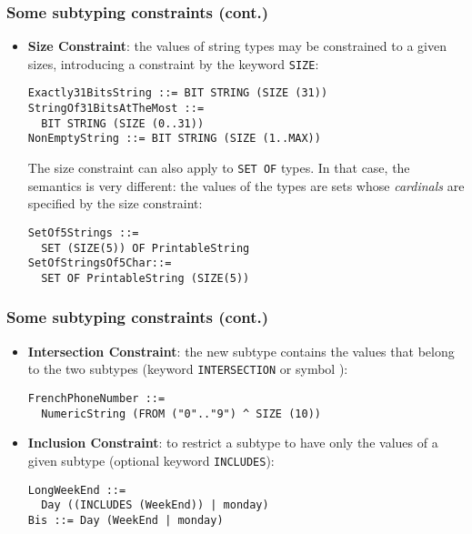 \documentclass[compress,dvips,xcolor={dvipsnames},t]{beamer}
\begin{document}
\begin{frame}[containsverbatim]
\frametitle{Some subtyping constraints (cont.)}

\begin{itemize}

  \item \textbf{Size Constraint}: the values of string types may be
        constrained to a given sizes, introducing a constraint by the
        keyword \texttt{SIZE}:

\begin{verbatim}
Exactly31BitsString ::= BIT STRING (SIZE (31))
StringOf31BitsAtTheMost ::=
  BIT STRING (SIZE (0..31))
NonEmptyString ::= BIT STRING (SIZE (1..MAX))
\end{verbatim}

The size constraint can also apply to \texttt{SET OF} types. In that
case, the semantics is very different: the values of the types are
sets whose \emph{cardinals} are specified by the size constraint:

\begin{verbatim}
SetOf5Strings ::=
  SET (SIZE(5)) OF PrintableString
SetOfStringsOf5Char::=
  SET OF PrintableString (SIZE(5))
\end{verbatim}

\end{itemize}

\end{frame}

\begin{frame}[containsverbatim]
\frametitle{Some subtyping constraints (cont.)}

\begin{itemize}

  \item \textbf{Intersection Constraint}: the new subtype contains the
        values that belong to the two subtypes (keyword
        \texttt{INTERSECTION} or symbol \texttt{}):

\begin{verbatim}
FrenchPhoneNumber ::= 
  NumericString (FROM ("0".."9") ^ SIZE (10))
\end{verbatim}

  \item \textbf{Inclusion Constraint}: to restrict a subtype to have
        only the values of a given subtype (optional keyword
        \texttt{INCLUDES}):

\begin{verbatim}
LongWeekEnd ::=
  Day ((INCLUDES (WeekEnd)) | monday)
Bis ::= Day (WeekEnd | monday)
\end{verbatim}
\end{itemize}

\end{frame}
\end{document}
